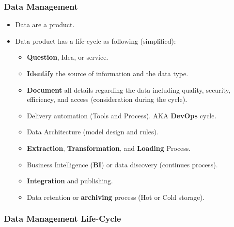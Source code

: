 \begin{frame}
\frametitle{Data Management}

\begin{itemize}[<+->]
\item Data are a product.
\item Data product has a life-cycle as following (simplified):
\begin{itemize}[<+->]
	\item \textbf{Question}, Idea, or service.
	\item \textbf{Identify} the source of information and the data type.
	\item \textbf{Document} all details regarding the data including quality, security, efficiency, and access (consideration during the cycle).
	\item Delivery automation (Tools and Process). AKA \textbf{DevOps} cycle.
	\item Data Architecture (model design and rules).
	\item \textbf{Extraction}, \textbf{Transformation}, and \textbf{Loading} Process.
	\item Business Intelligence (\textbf{BI}) or data discovery (continues process).
	\item \textbf{Integration} and publishing.
	\item Data retention or \textbf{archiving} process \forexample (Hot or Cold storage).
\end{itemize}
\end{itemize}

\end{frame}


\begin{frame}
\frametitle{Data Management Life-Cycle}
\end{frame}


